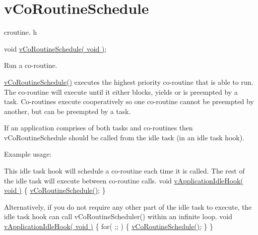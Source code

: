 \hypertarget{group__vCoRoutineSchedule}{\section{v\-Co\-Routine\-Schedule}
\label{group__vCoRoutineSchedule}
}
croutine. h 
\begin{DoxyPre}
 void \hyperlink{croutine_8h_a5333c649a2c063006ca3cd7a3b5b9240}{vCoRoutineSchedule( void )};\end{DoxyPre}


Run a co-\/routine.

\hyperlink{croutine_8h_a5333c649a2c063006ca3cd7a3b5b9240}{v\-Co\-Routine\-Schedule()} executes the highest priority co-\/routine that is able to run. The co-\/routine will execute until it either blocks, yields or is preempted by a task. Co-\/routines execute cooperatively so one co-\/routine cannot be preempted by another, but can be preempted by a task.

If an application comprises of both tasks and co-\/routines then v\-Co\-Routine\-Schedule should be called from the idle task (in an idle task hook).

Example usage\-: 
\begin{DoxyPre}
This idle task hook will schedule a co-routine each time it is called.
The rest of the idle task will execute between co-routine calls.
 void \hyperlink{main__mmc_8c_a97fd430f36f8b065226e2bff9bad1de5}{vApplicationIdleHook( void )}
 \{
    \hyperlink{croutine_8h_a5333c649a2c063006ca3cd7a3b5b9240}{vCoRoutineSchedule()};
 \}\end{DoxyPre}



\begin{DoxyPre}Alternatively, if you do not require any other part of the idle task to
execute, the idle task hook can call vCoRoutineScheduler() within an
infinite loop.
 void \hyperlink{main__mmc_8c_a97fd430f36f8b065226e2bff9bad1de5}{vApplicationIdleHook( void )}
 \{
    for( ;; )
    \{
        \hyperlink{croutine_8h_a5333c649a2c063006ca3cd7a3b5b9240}{vCoRoutineSchedule()};
    \}
 \}
 \end{DoxyPre}
 